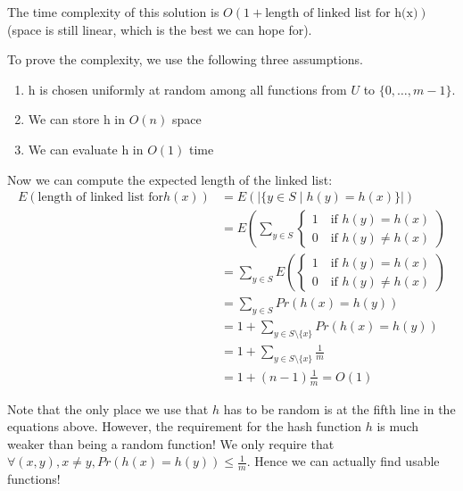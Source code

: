         The time complexity of this solution is $O(1 + \text{length of linked list for h(x)})$ (space is still linear, which is the best we can hope for).

        To prove the complexity, we use the following three assumptions.
        \begin{enumerate}[label=\Roman*]
            \item h is chosen uniformly at random among all functions from $U$ to $\{0, \ldots, m-1\}$.
            \item We can store h in $O(n)$ space
            \item We can evaluate h in $O(1)$ time
        \end{enumerate}
        Now we can compute the expected length of the linked list:
        \begin{align*}
            E(\text{length of linked list for} h(x)) &= E(|\{y \in S \mid h(y) = h(x)\}|) \\
            &= E\left(\sum_{y \in S}
                \begin{cases}
                    1 \quad \text{if } h(y) = h(x) \\
                    0 \quad \text{if } h(y) \not = h(x)
                \end{cases}
                \right) \\
            &= \sum_{y \in S} E\left(
                \begin{cases}
                    1 \quad \text{if } h(y) = h(x) \\
                    0 \quad \text{if } h(y) \not = h(x)
                \end{cases}
                \right) \\
            &= \sum_{y \in S} Pr(h(x) = h(y)) \\
            &= 1 + \sum_{y \in S \setminus \{x\}} Pr(h(x) = h(y)) \\
            &= 1 + \sum_{y \in S \setminus \{x\}} \frac{1}{m} \\
            &= 1 + (n - 1) \frac{1}{m} = O(1)
        \end{align*}

        Note that the only place we use that $h$ has to be random is at the fifth line in the equations above. However, the requirement for the hash function $h$ is much weaker than being a random function! We only require that $\forall (x, y), x \not = y, Pr(h(x) = h(y)) \leq \frac{1}{m}$. Hence we can actually find usable functions!

